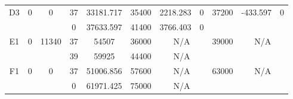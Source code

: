 \begin{sidewaystable}
\begin{tabular}{c||c|c||c|c|c|c|c||c|c|c}
         &
        
      \\
      \hline
      \multirow{2}{*}{D3} &
      \multirow{2}{*}{0} &
      \multirow{2}{*}{0} &
      37 &
      33181.717 &
      35400 &
        2218.283 &
        0 &
      \multirow{2}{*}{37200} &
        \multirow{2}{*}{-433.597} &
        \multirow{2}{*}{0}
      \\
      \cline{4-8}
       &
       &
       &
      0 &
      37633.597 &
      41400 &
        3766.403 &
        0 &
      
         &
        
      \\
      \hline
      \multirow{2}{*}{E1} &
      \multirow{2}{*}{0} &
      \multirow{2}{*}{11340} &
      37 &
      54507 &
      36000 &
        \multicolumn{2}{|c||}{N/A} &
      \multirow{2}{*}{39000} &
        \multicolumn{2}{c}{\multirow{2}{*}{N/A}}
      \\
      \cline{4-8}
       &
       &
       &
      39 &
      59925 &
      44400 &
        \multicolumn{2}{|c||}{N/A} &
      
        
      \\
      \hline
      \multirow{2}{*}{F1} &
      \multirow{2}{*}{0} &
      \multirow{2}{*}{0} &
      37 &
      51006.856 &
      57600 &
        \multicolumn{2}{|c||}{N/A} &
      \multirow{2}{*}{63000} &
        \multicolumn{2}{c}{\multirow{2}{*}{N/A}}
      \\
      \cline{4-8}
       &
       &
       &
      0 &
      61971.425 &
      75000 &
        \multicolumn{2}{|c||}{N/A} &
      
        
      \\
\end{tabular}
\label{table:RDS1-1584.tex} 
\end{sidewaystable}